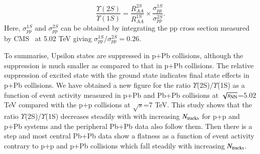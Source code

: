\begin{equation}
\frac{\Upsilon(2S)}{\Upsilon(1S)} = \frac{R_{AA}^{2S}}{R_{AA}^{1S}} \times \frac{\sigma_{pp}^{1S}}{\sigma_{pp}^{2S}}.
\end{equation}
Here, $\sigma_{pp}^{1S}$ and $\sigma_{pp}^{2S}$ can be obtained by integrating the pp cross section
measured by CMS~\cite{CMS:2013jsu} at 5.02 TeV giving $\sigma_{pp}^{1S}/\sigma_{pp}^{2S}=0.26$.





To summarise, Upsilon states are suppressed in p+Pb collisions, although
the suppression is much smaller as compared to that in p+Pb collisions.
The relative suppression of excited state with the ground state indicates final
state effects in p+Pb collisions. 
We have obtained a new figure for the ratio $\Upsilon$(2S)/$\Upsilon$(1S)
as a function of event activity measured in p+Pb and Pb+Pb collisions at
$\sqrt{s_{\rm NN}}$=5.02 TeV compared with the 
p+p collisions at $\sqrt{s}$=7 TeV. This study shows 
that the ratio $\Upsilon$(2S)/$\Upsilon$(1S) decreases steadily
with with increasing $N_{\rm tracks}$ for
p+p and p+Pb systems and the peripheral Pb+Pb data also follow them.
Then there is a step and most central Pb+Pb
data show a flatness as a function of event activity contrary to p+p and
p+Pb collisions which fall steadily with increasing $N_{\rm tracks}$.

  

